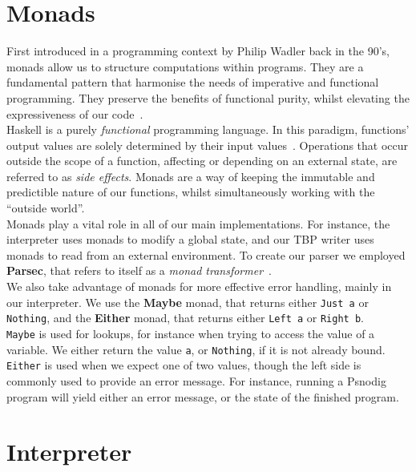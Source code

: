 \section{Monads}

First introduced in a programming context by Philip Wadler back in the 90's, monads allow us to structure computations within programs. They are a fundamental pattern that harmonise the needs of imperative and functional programming. They preserve the benefits of functional purity, whilst elevating the expressiveness of our code~\cite{originOfMonads, leifharaldMaster}. \\

Haskell is a purely \textit{functional} programming language. In this paradigm, functions' output values are solely determined by their input values~\cite{whatIsHaskell}. Operations that occur outside the scope of a function, affecting or depending on an external state, are referred to as \textit{side effects}. Monads are a way of keeping the immutable and predictible nature of our functions, whilst simultaneously working with the ``outside world''. \\

Monads play a vital role in all of our main implementations. For instance, the interpreter uses monads to modify a global state, and our TBP writer uses monads to read from an external environment. To create our parser we employed \textbf{Parsec}, that refers to itself as a \textit{monad transformer}~\cite{parsec}. \\

We also take advantage of monads for more effective error handling, mainly in our interpreter. We use the \textbf{Maybe} monad, that returns either \texttt{Just a} or \texttt{Nothing}, and the \textbf{Either} monad, that returns either \texttt{Left a} or \texttt{Right b}. \\

\texttt{Maybe} is used for lookups, for instance when trying to access the value of a variable. We either return the value \texttt{a}, or \texttt{Nothing}, if it is not already bound. \texttt{Either} is used when we expect one of two values, though the left side is commonly used to provide an error message. For instance, running a Psnodig program will yield either an error message, or the state of the finished program. \\

\section{Interpreter}

